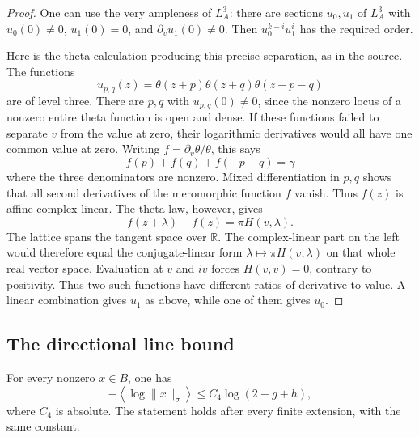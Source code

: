 \begin{proof}
One can use the very ampleness of \(L_A^3\):
there are sections \(u_0,u_1\) of \(L_A^3\)
with \(u_0(0)\ne0\), \(u_1(0)=0\), and
\(\partial_vu_1(0)\ne0\).
Then \(u_0^{k-i}u_1^i\) has the required
order.

Here is the theta calculation producing
this precise separation, as in the source.
The functions
\[
 u_{p,q}(z)=
      \theta(z+p)\theta(z+q)\theta(z-p-q)
\]
are of level three.
There are \(p,q\) with \(u_{p,q}(0)\ne0\),
since the nonzero locus of a nonzero entire
theta function is open and dense.
If these functions failed to separate
\(v\) from the value at zero, their
logarithmic derivatives would all have
one common value at zero.
Writing
\(f=\partial_v\theta/\theta\), this says
\[
                 f(p)+f(q)+f(-p-q)=\gamma
\]
where the three denominators are nonzero.
Mixed differentiation in \(p,q\) shows
that all second derivatives of the
meromorphic function \(f\) vanish.
Thus \(f(z)\) is affine complex linear.
The theta law, however, gives
\[
                  f(z+\lambda)-f(z)
                                  =\pi H(v,\lambda).
\]
The lattice spans the tangent space over
\(\mathbb R\).
The complex-linear part on the left would
therefore equal the conjugate-linear form
\(\lambda\mapsto\pi H(v,\lambda)\) on that
whole real vector space.
Evaluation at \(v\) and \(iv\) forces
\(H(v,v)=0\), contrary to positivity.
Thus two such functions have different
ratios of derivative to value.
A linear combination gives \(u_1\) as
above, while one of them gives \(u_0\).
\end{proof}

\subsection{The directional line bound}

\begin{srproposition}\label{prop:sr-slope-integral-line-bound}
For every nonzero \(x\in B\), one has
\[
 -\left\langle\log\|x\|_\sigma\right\rangle
                    \le C_4\log(2+g+h),              \tag{SB14}
\]
where \(C_4\) is absolute.
The statement holds after every finite
extension, with the same constant.
\end{srproposition}

